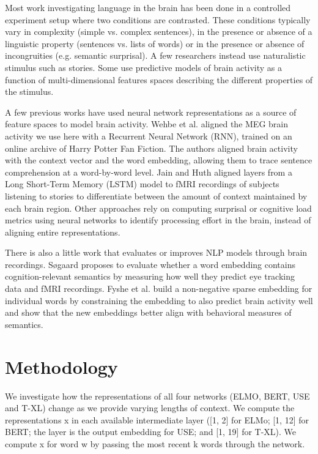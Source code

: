 \documentclass{article}
\begin{document}
Most work investigating language in the brain has been done in a controlled experiment setup where two conditions are contrasted\cite{friederici2011brain}. These conditions typically vary in complexity (simple vs. complex sentences), in the presence or absence of a linguistic property (sentences vs. lists of words) or in the presence or absence of incongruities (e.g. semantic surprisal)\cite{friederici2011brain}. A few researchers instead use naturalistic stimulus such as stories\cite{brennan2012syntactic}. Some use predictive models of brain activity as a function of multi-dimensional features spaces describing the different properties of the stimulus\cite{wehbe2014simultaneously}.

A few previous works have used neural network representations as a source of feature spaces to model brain activity. Wehbe et al.\cite{wehbe2014simultaneously} aligned the MEG brain activity we use here with a Recurrent Neural Network (RNN), trained on an online archive of Harry Potter Fan Fiction. The authors aligned brain activity with the context vector and the word embedding, allowing them to trace sentence comprehension at a word-by-word level. Jain and Huth\cite{jain2018incorporating} aligned layers from a Long Short-Term Memory (LSTM) model to fMRI recordings of subjects listening to stories to differentiate between the amount of context maintained by each brain region. Other approaches rely on computing surprisal or cognitive load metrics using neural networks to identify processing effort in the brain, instead of aligning entire representations\cite{frank2015erp}.

There is also a little work that evaluates or improves NLP models through brain recordings. Søgaard\cite{sogaard2016evaluating} proposes to evaluate whether a word embedding contains cognition-relevant semantics by measuring how well they predict eye tracking data and fMRI recordings. Fyshe et al.\cite{fyshe2014interpretable} build a non-negative sparse embedding for individual words by constraining the embedding to also predict brain activity well and show that the new embeddings better align with behavioral measures of semantics.


\section{Methodology}\label{sec:methodology}

We investigate how the representations of all four networks (ELMO, BERT, USE and T-XL) change as we provide varying lengths of context. We compute the representations x in each available intermediate layer ([1, 2] for ELMo; [1, 12] for BERT; the layer is the output embedding for USE; and [1, 19] for T-XL). We compute x for word w by passing the most recent k words through the network.
\end{document}
